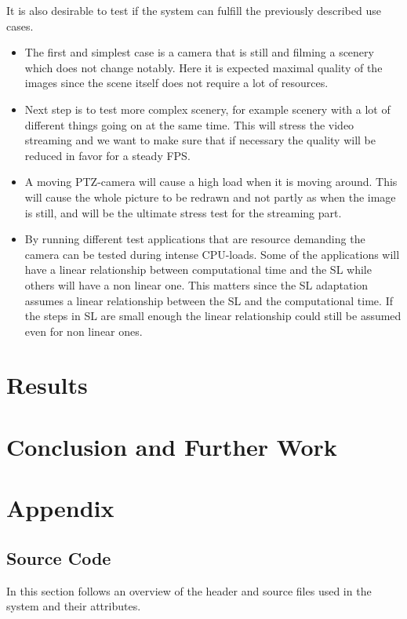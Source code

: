 \documentclass[nobiblatex]{LTHthesis}
\begin{document}
It is also desirable to test if the system can fulfill the previously described use cases.

\begin{itemize}

\item The first and simplest case is a camera that is still and filming a scenery which does not change notably. Here it is expected maximal quality of the images since the scene itself does not require a lot of resources. 
\item Next step is to test more complex scenery, for example scenery with a lot of different things going on at the same time. This will stress the video streaming and we want to make sure that if necessary the quality will be reduced in favor for a steady FPS.
\item A moving PTZ-camera will cause a high load when it is moving around. This will cause the whole picture to be redrawn and not partly as when the image is still, and will be the ultimate stress test for the streaming part.
\item By running different test applications that are resource demanding the camera can be tested during intense CPU-loads. Some of the applications will have a linear relationship between computational time and the SL while others will have a non linear one. This matters since the SL adaptation assumes a linear relationship between the SL and the computational time. If the steps in SL are small enough the linear relationship could still be assumed even for non linear ones.
\end{itemize}

\chapter{Results}
\label{chp:results}

\chapter{Conclusion and Further Work}
\label{chp:conclusion}





\chapter{Appendix}
\section{Source Code}
In this section follows an overview of the header and source files used in the system and their attributes.
\end{document}
